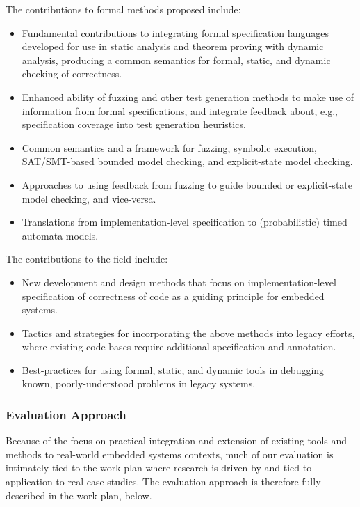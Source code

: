 The contributions to formal methods proposed include:

\begin{itemize}
\item Fundamental contributions to integrating formal specification
languages developed for use in static analysis and theorem proving
with dynamic analysis, producing a common semantics for formal,
static, and dynamic checking of correctness.
\item Enhanced ability of fuzzing and other test generation methods to
make use of information from formal specifications, and integrate
feedback about, e.g., specification coverage into test generation
heuristics.
\item Common semantics and a framework for fuzzing, symbolic execution, SAT/SMT-based
bounded model checking, and explicit-state model checking.
\item Approaches to using feedback from fuzzing to guide bounded or explicit-state model
checking, and vice-versa.
\item Translations from implementation-level specification to
(probabilistic) timed automata models.
\end{itemize}

The contributions to the field include:

\begin{itemize}
\item New development and design methods that focus on
implementation-level specification of correctness of code as a guiding
principle for embedded systems.
\item Tactics and strategies for incorporating the above methods into
legacy efforts, where existing code bases require additional
specification and annotation.
\item Best-practices for using formal, static, and dynamic tools in
debugging known, poorly-understood problems in legacy systems.
\end{itemize}

\subsubsection{Evaluation Approach}
\label{sec:eval}

Because of the focus on practical integration and extension of
existing tools and methods to real-world embedded systems contexts,
much of our evaluation is intimately tied to the work plan where
research is driven by and tied to application to real case studies.
The evaluation approach is therefore fully described in the work plan, below.